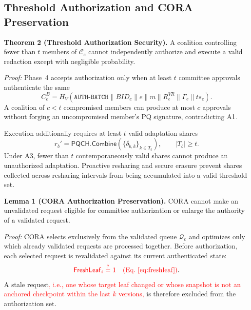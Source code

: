 \documentclass[lettersize,journal]{IEEEtran}
\begin{document}
\subsection{Threshold Authorization and CORA Preservation}

\textbf{Theorem 2 (Threshold Authorization Security).}
A coalition controlling fewer than $t$ members of
$\mathcal{C}_e$ cannot independently authorize and execute a valid
redaction except with negligible probability.

\emph{Proof:}
Phase~4 accepts authorization only when at least $t$ committee
approvals authenticate the same
\begin{equation}
C_e^B=
H_V(\texttt{AUTH-BATCH}\parallel BID_e\parallel e\parallel m
\parallel R_e^{VR}\parallel\Gamma_e\parallel ts_e).
\label{eq:sec_auth_batch}
\end{equation}
A coalition of $c<t$ compromised members can produce at most $c$
approvals without forging an uncompromised member's PQ signature,
contradicting A1.

Execution additionally requires at least $t$ valid adaptation shares
\begin{equation}
r_b'=
\mathsf{PQCH.Combine}
(\{\delta_{b,k}\}_{k\in T_b}),
\qquad |T_b|\geq t.
\end{equation}
Under A3, fewer than $t$ contemporaneously valid shares cannot produce
an unauthorized adaptation. Proactive resharing and secure erasure
prevent shares collected across resharing intervals from being
accumulated into a valid threshold set.

\medskip
\noindent\textbf{Lemma 1 (CORA Authorization Preservation).}
CORA cannot make an unvalidated request eligible for committee
authorization or enlarge the authority of a validated request.

\emph{Proof:}
CORA selects exclusively from the validated queue $\mathcal{Q}_e$ and
optimizes only which already validated requests are processed together.
Before authorization, each selected request is revalidated against its
current authenticated state:
\begin{equation}
\textcolor{red}{\mathsf{FreshLeaf}_i\stackrel{?}{=}1
\quad\text{(Eq.~\eqref{eq:freshleaf})}}.
\end{equation}
A stale request\textcolor{red}{, i.e., one whose target leaf changed or
whose snapshot is not an anchored checkpoint within the last $k$
versions,} is therefore excluded from the authorization set.
\end{document}
